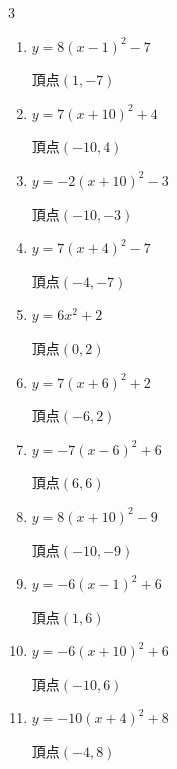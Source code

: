 \begin{multicols}{3}
\begin{enumerate}
        $\displaystyle 頂点\left( 3 , 5 \right)$

  \item $\displaystyle y=8\left( x-1\right)^{2}-7$

        $\displaystyle 頂点\left( 1 , -7 \right)$

  \item $\displaystyle y=7\left( x+10\right)^{2}+4$

        $\displaystyle 頂点\left( -10 , 4 \right)$

  \item $\displaystyle y=-2\left( x+10\right)^{2}-3$

        $\displaystyle 頂点\left( -10 , -3 \right)$

  \item $\displaystyle y=7\left( x+4\right)^{2}-7$

        $\displaystyle 頂点\left( -4 , -7 \right)$

  \item $\displaystyle y=6x^{2}+2$

        $\displaystyle 頂点\left( 0 , 2 \right)$

  \item $\displaystyle y=7\left( x+6\right)^{2}+2$

        $\displaystyle 頂点\left( -6 , 2 \right)$

  \item $\displaystyle y=-7\left( x-6\right)^{2}+6$

        $\displaystyle 頂点\left( 6 , 6 \right)$

  \item $\displaystyle y=8\left( x+10\right)^{2}-9$

        $\displaystyle 頂点\left( -10 , -9 \right)$

  \item $\displaystyle y=-6\left( x-1\right)^{2}+6$

        $\displaystyle 頂点\left( 1 , 6 \right)$

  \item $\displaystyle y=-6\left( x+10\right)^{2}+6$

        $\displaystyle 頂点\left( -10 , 6 \right)$

\columnbreak %

\resetques

  \item $\displaystyle y=-10\left( x+4\right)^{2}+8$

        $\displaystyle 頂点\left( -4 , 8 \right)$


\end{enumerate}
\end{multicols}
